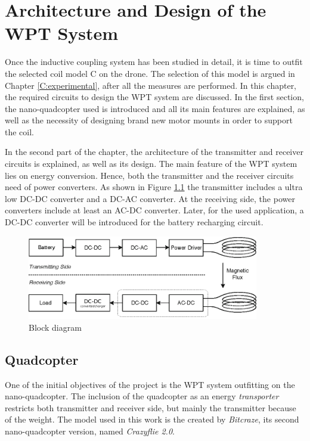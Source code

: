 \chapter{Architecture and Design of the WPT System} \label{C:architecture}
Once the inductive coupling system has been studied in detail, it is time to outfit the selected coil model C on the drone. The selection of this model is argued in Chapter \ref{C:experimental}, after all the measures are performed. In this chapter, the required circuits to design the WPT system are discussed. In the first section, the nano-quadcopter used is introduced and all its main features are explained, as well as the necessity of designing brand new motor mounts in order to support the coil. 

In the second part of the chapter, the architecture of the transmitter and receiver circuits is explained, as well as its design. The main feature of the WPT system lies on energy conversion. Hence, both the transmitter and the receiver circuits need of power converters. As shown in Figure \ref{F:blockDiagram} the transmitter includes a ultra low DC-DC converter and a DC-AC converter. At the receiving side, the power converters include at least an AC-DC converter. Later, for the used application, a DC-DC converter will be introduced for the battery recharging circuit.


\begin{figure}[htb]
\begin{center}
\vspace{+0.5em}
\includegraphics[width=0.9\textwidth]{./images/block2}
\caption{Block diagram}
\label{F:blockDiagram}
\end{center}
\end{figure}


  \section{Quadcopter}
One of the initial objectives of the project is the WPT system outfitting on the nano-quadcopter. The inclusion of the quadcopter as an energy \textit{transporter} restricts both transmitter and receiver side, but mainly the transmitter because of the weight. The model used in this work is the created by \textit{Bitcraze}, its second nano-quadcopter version, named \textit{Crazyflie 2.0}. 

